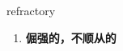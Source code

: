 
\begin{frame}
{\huge refractory}
\begin{center}
\begin{enumerate}\Large
  \item \textbf{倔强的，不顺从的}
\end{enumerate}
\end{center}
\end{frame}
